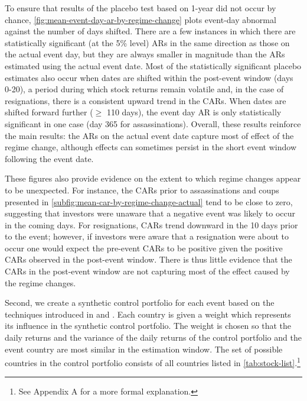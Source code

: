 \documentclass[12pt,final,fleqn]{article}
\theoremstyle{plain}
\begin{document}
To ensure that results of the placebo test based on 1-year did not occur by chance, \autoref{fig:mean-event-day-ar-by-regime-change} plots event-day abnormal against the number of days shifted. There are a few instances in which there are statistically significant (at the 5\% level) ARs in the same direction as those on the actual event day, but they are always smaller in magnitude than the ARs estimated using the actual event date. Most of the statistically significant placebo estimates also occur when dates are shifted within the post-event window (days 0-20), a period during which stock returns remain volatile and, in the case of resignations, there is a consistent upward trend in the CARs. When dates are shifted forward further ($\geq$ 110 days), the event day AR is only statistically significant in one case (day 365 for assassinations). Overall, these results reinforce the main results: the ARs on the actual event date capture most of effect of the regime change, although effects can sometimes persist in the short event window following the event date. 

These figures also provide evidence on the extent to which regime changes appear to be unexpected. For instance, the CARs prior to assassinations and coups presented in \autoref{subfig:mean-car-by-regime-change-actual} tend to be close to zero, suggesting that investors were unaware that a negative event was likely to occur in the coming days. For resignations, CARs trend downward in the 10 days prior to the event; however, if investors were aware that a resignation were about to occur one would expect the pre-event CARs to be positive given the positive CARs observed in the post-event window. There is thus little evidence that the CARs in the post-event window are not capturing most of the effect caused by the regime changes.

Second, we create a synthetic control portfolio for each event based on the techniques introduced in \citet{abadie2003economic} and \citet{abadie2010synthetic}. Each country is given a weight which represents its influence in the synthetic control portfolio. The weight is chosen so that the daily returns and the variance of the daily returns of the control portfolio and the event country are most similar in the estimation window. The set of possible countries in the control portfolio consists of all countries listed in \autoref{tab:stock-list}.\footnote{See Appendix A for a more formal explanation.}
\end{document}

